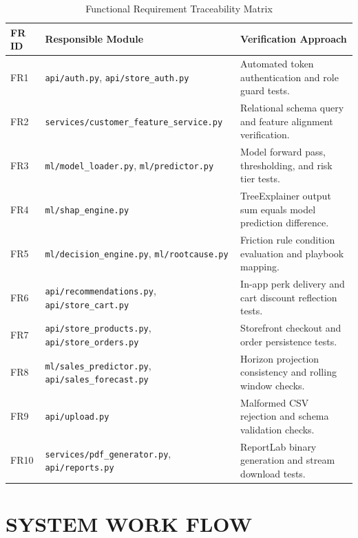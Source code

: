 \documentclass[12pt,a4paper]{article}
\begin{document}
\begin{table}[H]
\centering
\small
\caption{Functional Requirement Traceability Matrix}
\begin{tabularx}{\linewidth}{|C{1.5cm}|L{4.5cm}|Y|}
\hline
\textbf{FR ID} & \textbf{Responsible Module} & \textbf{Verification Approach} \\ \hline
FR1 & \texttt{api/auth.py}, \texttt{api/store\_auth.py} & Automated token authentication and role guard tests. \\ \hline
FR2 & \texttt{services/customer\_feature\_service.py} & Relational schema query and feature alignment verification. \\ \hline
FR3 & \texttt{ml/model\_loader.py}, \texttt{ml/predictor.py} & Model forward pass, thresholding, and risk tier tests. \\ \hline
FR4 & \texttt{ml/shap\_engine.py} & TreeExplainer output sum equals model prediction difference. \\ \hline
FR5 & \texttt{ml/decision\_engine.py}, \texttt{ml/rootcause.py} & Friction rule condition evaluation and playbook mapping. \\ \hline
FR6 & \texttt{api/recommendations.py}, \texttt{api/store\_cart.py} & In-app perk delivery and cart discount reflection tests. \\ \hline
FR7 & \texttt{api/store\_products.py}, \texttt{api/store\_orders.py} & Storefront checkout and order persistence tests. \\ \hline
FR8 & \texttt{ml/sales\_predictor.py}, \texttt{api/sales\_forecast.py} & Horizon projection consistency and rolling window checks. \\ \hline
FR9 & \texttt{api/upload.py} & Malformed CSV rejection and schema validation checks. \\ \hline
FR10 & \texttt{services/pdf\_generator.py}, \texttt{api/reports.py} & ReportLab binary generation and stream download tests. \\ \hline
\end{tabularx}
\label{tab:traceability_matrix}
\end{table}

\newpage

\section{SYSTEM WORK FLOW}\label{chap:3}
\end{document}
